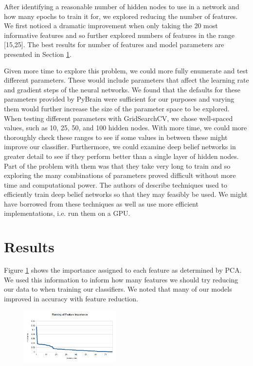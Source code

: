 \documentclass{article}
\begin{document}
After identifying a reasonable number of hidden nodes to use in a network and how many epochs to train it for, we explored reducing the number of features.
We first noticed a dramatic improvement when only taking the 20 most informative features and so further explored numbers of features in the range [15,25].
The best results for number of features and model parameters are presented in Section \ref{results}.

Given more time to explore this problem, we could more fully enumerate and test different parameters.
These would include parameters that affect the learning rate and gradient steps of the neural networks.
We found that the defaults for these parameters provided by PyBrain were sufficient for our purposes and varying them would further increase the size of the parameter space to be explored.
When testing different parameters with GridSearchCV, we chose well-spaced values, such as 10, 25, 50, and 100 hidden nodes.
With more time, we could more thoroughly check these ranges to see if some values in between these might improve our classifier.
Furthermore, we could examine deep belief networks in greater detail to see if they perform better than a single layer of hidden nodes.
Part of the problem with them was that they take very long to train and so exploring the many combinations of parameters proved difficult without more time and computational power.
The authors of \cite{deep_belief} describe techniques used to efficiently train deep belief networks so that they may feasibly be used.
We might have borrowed from these techniques as well as use more efficient implementations, i.e. run them on a GPU.


\section{Results}
\label{results}

Figure \ref{feature_importance} shows the importance assigned to each feature as determined by PCA.
We used this information to inform how many features we should try reducing our data to when training our classifiers.
We noted that many of our models improved in accuracy with feature reduction.

\begin{figure}[!h]
\centering
\includegraphics[width=0.45\textwidth]{feature_importance}
\label{feature_importance}
\end{figure}
\end{document}
